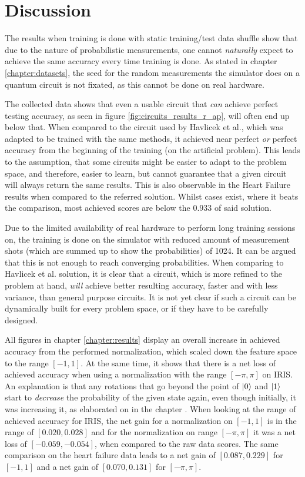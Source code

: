 \clearpage
\section{Discussion}
The results when training is done with static training/test data shuffle show that due to the nature of probabilistic measurements, one cannot \emph{naturally} expect to achieve the same accuracy every time training is done. As stated in chapter \ref{chapter:datasets}, the seed for the random measurements the simulator does on a quantum circuit is not fixated, as this cannot be done on real hardware.\par 
The collected data shows that even a usable circuit that \emph{can} achieve perfect testing accuracy, as seen in figure \ref{fig:circuits_results_r_ap}, will often end up below that. When compared to the circuit used by Havlicek et al.\cite{havlicek_supervised_2019}, which was adapted to be trained with the same methods, it achieved near perfect \emph{or} perfect accuracy from the beginning of the training (on the artificial problem). This leads to the assumption, that some circuits might be easier to adapt to the problem space, and therefore, easier to learn, but cannot guarantee that a given circuit will always return the same results. This is also observable in the Heart Failure results when compared to the referred solution. Whilst cases exist, where it beats the comparison, most achieved scores are below the $0.933$ of said solution.\par 
Due to the limited availability of real hardware to perform long training sessions on, the training is done on the simulator with reduced amount of measurement shots (which are summed up to show the probabilities) of 1024. It can be argued that this is not enough to reach converging probabilities. When comparing to Havlicek et al. solution, it is clear that a circuit, which is more refined to the problem at hand, \emph{will} achieve better resulting accuracy, faster and with less variance, than general purpose circuits. It is not yet clear if such a circuit can be dynamically built for every problem space, or if they have to be carefully designed.\par
All figures in chapter \ref{chapter:results} display an overall increase in achieved accuracy from the performed normalization, which scaled down the feature space to the range $[-1,1]$. At the same time, it shows that there is a net loss of achieved accuracy when using a normalization with the range $[-\pi,\pi]$ on IRIS. An explanation is that any rotations that go beyond the point of $\ket{0}$ and $\ket{1}$ start to \emph{decrease} the probability of the given state again, even though initially, it was increasing it, as elaborated on in the chapter . When looking at the range of achieved accuracy for IRIS, the net gain for a normalization on $[-1,1]$ is in the range of $[0.020,0.028]$ and for the normalization on range $[-\pi,\pi]$ it was a net loss of $[-0.059,-0.054]$, when compared to the raw data scores. The same comparison on the heart failure data leads to a net gain of $[0.087, 0.229]$ for $[-1,1]$ and a net gain of $[0.070,0.131]$ for $[-\pi,\pi]$. \par
